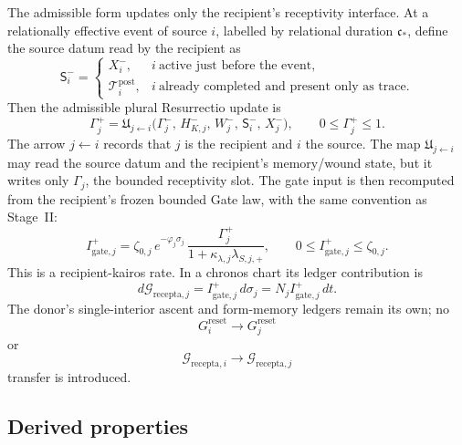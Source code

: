 \documentclass[11pt,a4paper]{article}
\theoremstyle{definition}
\theoremstyle{plain}
\theoremstyle{remark}
\begin{document}
The admissible form updates only the recipient's receptivity interface. At a
relationally effective event of source \(i\), labelled by relational duration
\(\mathfrak c_*\), define the source datum read by the recipient as
\[
\mathsf S_i^-
=
\begin{cases}
X_i^-, & i\ \text{active just before the event},\\[0.25em]
\mathcal T_i^{\mathrm{post}}, & i\ \text{already completed and present only as trace}.
\end{cases}
\]
Then the admissible plural Resurrectio update is
\[
\boxed{\;
\Gamma_j^{+}
=
\mathfrak U_{j\leftarrow i}
\bigl(
\Gamma_j^{-},\,H_{K,j}^{-},\,W_j^{-},\,\mathsf S_i^{-},\,X_j^{-}
\bigr),
\qquad
0\le\Gamma_j^{+}\le1.
\;}
\]
The arrow \(j\leftarrow i\) records that \(j\) is the recipient and \(i\) the
source. The map \(\mathfrak U_{j\leftarrow i}\) may read the source datum and the
recipient's memory/wound state, but it writes only \(\Gamma_j\), the bounded
receptivity slot.
The gate input is then recomputed from the recipient's frozen bounded Gate law,
with the same convention as Stage~II:
\[
I_{\mathrm{gate},j}^{+}
=
\zeta_{0,j}\,e^{-\varphi_j\sigma_j}\,
\frac{
\Gamma_j^{+}
}{
1+\kappa_{\lambda,j}\lambda_{S,j,+}
},
\qquad
0\le I_{\mathrm{gate},j}^{+}\le \zeta_{0,j}.
\]
This is a recipient-kairos rate. In a chronos chart its ledger contribution is
\[
d\mathcal G_{\mathrm{recepta},j}
=
I_{\mathrm{gate},j}^{+}\,d\sigma_j
=
N_j I_{\mathrm{gate},j}^{+}\,dt.
\]
The donor's single-interior ascent and form-memory ledgers remain its own; no
\[
G_i^{\mathrm{reset}}\to G_j^{\mathrm{reset}}
\]
or
\[
\mathcal G_{\mathrm{recepta},i}\to \mathcal G_{\mathrm{recepta},j}
\]
transfer is introduced.

\subsection{Derived properties}
\end{document}

